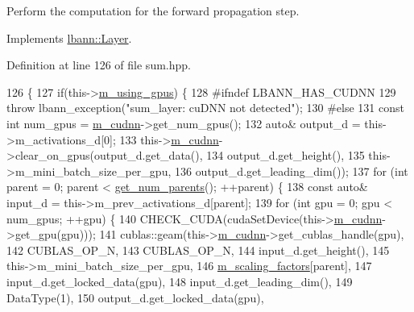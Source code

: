 Perform the computation for the forward propagation step. 

Implements \hyperlink{classlbann_1_1Layer_a523319dd1bd87a0612afa1912bb5aad7}{lbann\+::\+Layer}.



Definition at line 126 of file sum.\+hpp.


\begin{DoxyCode}
126                              \{
127     \textcolor{keywordflow}{if}(this->\hyperlink{classlbann_1_1Layer_af7881cb5eff5207c15fa835d65462e8f}{m\_using\_gpus}) \{
128 \textcolor{preprocessor}{  #ifndef LBANN\_HAS\_CUDNN}
129       \textcolor{keywordflow}{throw} lbann\_exception(\textcolor{stringliteral}{"sum\_layer: cuDNN not detected"});
130 \textcolor{preprocessor}{  #else}
131       \textcolor{keyword}{const} \textcolor{keywordtype}{int} num\_gpus = \hyperlink{classlbann_1_1Layer_a08dbb94239e3b8c96329786c57c72e21}{m\_cudnn}->get\_num\_gpus();
132       \textcolor{keyword}{auto}& output\_d = this->m\_activations\_d[0];
133       this->\hyperlink{classlbann_1_1Layer_a08dbb94239e3b8c96329786c57c72e21}{m\_cudnn}->clear\_on\_gpus(output\_d.get\_data(),
134                                    output\_d.get\_height(),
135                                    this->m\_mini\_batch\_size\_per\_gpu,
136                                    output\_d.get\_leading\_dim());
137       \textcolor{keywordflow}{for} (\textcolor{keywordtype}{int} parent = 0; parent < \hyperlink{classlbann_1_1Layer_ac9290d4a6453ccda5f6b4d8b57b49ba3}{get\_num\_parents}(); ++parent) \{
138         \textcolor{keyword}{const} \textcolor{keyword}{auto}& input\_d = this->m\_prev\_activations\_d[parent];
139         \textcolor{keywordflow}{for} (\textcolor{keywordtype}{int} gpu = 0; gpu < num\_gpus; ++gpu) \{
140           CHECK\_CUDA(cudaSetDevice(this->\hyperlink{classlbann_1_1Layer_a08dbb94239e3b8c96329786c57c72e21}{m\_cudnn}->get\_gpu(gpu)));
141           cublas::geam(this->\hyperlink{classlbann_1_1Layer_a08dbb94239e3b8c96329786c57c72e21}{m\_cudnn}->get\_cublas\_handle(gpu),
142                        CUBLAS\_OP\_N,
143                        CUBLAS\_OP\_N,
144                        input\_d.get\_height(),
145                        this->m\_mini\_batch\_size\_per\_gpu,
146                        \hyperlink{classlbann_1_1sum__layer_a371ae9038d8654fbca134e0f61e1e29a}{m\_scaling\_factors}[parent],
147                        input\_d.get\_locked\_data(gpu),
148                        input\_d.get\_leading\_dim(),
149                        DataType(1),
150                        output\_d.get\_locked\_data(gpu),

\end{DoxyCode}
